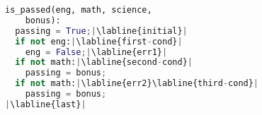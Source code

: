 \begin{lstlisting}[language=Python,escapechar=|]
is_passed(eng, math, science,
    bonus):
  passing = True;|\labline{initial}|
  if not eng:|\labline{first-cond}|
    eng = False;|\labline{err1}|
  if not math:|\labline{second-cond}|
    passing = bonus;
  if not math:|\labline{err2}\labline{third-cond}|
    passing = bonus;
|\labline{last}|
\end{lstlisting}
